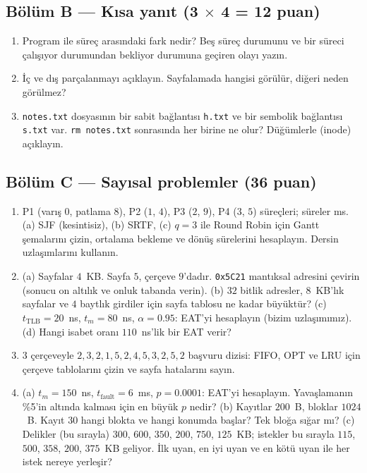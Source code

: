 \documentclass[11pt,a4paper]{article}
\newcommand{\cmd}[1]{\texttt{#1}}
\begin{document}
\subsection*{Bölüm B --- Kısa yanıt (3 $\times$ 4 = 12 puan)}
\begin{enumerate}[leftmargin=1.6em,label=B\arabic*.]
  \item Program ile süreç arasındaki fark nedir? Beş süreç durumunu ve bir süreci çalışıyor durumundan bekliyor durumuna geçiren olayı yazın. 
  \item İç ve dış parçalanmayı açıklayın. Sayfalamada hangisi görülür, diğeri neden görülmez? 
  \item \texttt{notes.txt} dosyasının bir sabit bağlantısı \texttt{h.txt} ve bir sembolik bağlantısı \texttt{s.txt} var. \cmd{rm notes.txt} sonrasında her birine ne olur? Düğümlerle (inode) açıklayın. 
\end{enumerate}

\subsection*{Bölüm C --- Sayısal problemler (36 puan)}
\begin{enumerate}[leftmargin=1.6em,label=C\arabic*.]
  \item P1 (varış $0$, patlama $8$), P2 ($1$, $4$), P3 ($2$, $9$), P4 ($3$, $5$) süreçleri; süreler ms. (a) SJF (kesintisiz), (b) SRTF, (c) $q = 3$ ile Round Robin için Gantt şemalarını çizin, ortalama bekleme ve dönüş sürelerini hesaplayın. Dersin uzlaşımlarını kullanın. 
  \item (a) Sayfalar $4$~KB. Sayfa $5$, çerçeve $9$'dadır. \texttt{0x5C21} mantıksal adresini çevirin (sonucu on altılık ve onluk tabanda verin). (b) $32$ bitlik adresler, $8$~KB'lık sayfalar ve $4$ baytlık girdiler için sayfa tablosu ne kadar büyüktür? (c) $t_{\text{TLB}} = 20$~ns, $t_m = 80$~ns, $\alpha = 0.95$: EAT'yi hesaplayın (bizim uzlaşımımız). (d) Hangi isabet oranı $110$~ns'lik bir EAT verir? 
  \item $3$ çerçeveyle $2, 3, 2, 1, 5, 2, 4, 5, 3, 2, 5, 2$ başvuru dizisi: FIFO, OPT ve LRU için çerçeve tablolarını çizin ve sayfa hatalarını sayın. 
  \item (a) $t_m = 150$~ns, $t_{\text{fault}} = 6$~ms, $p = 0.0001$: EAT'yi hesaplayın. Yavaşlamanın \%5'in altında kalması için en büyük $p$ nedir? (b) Kayıtlar $200$~B, bloklar $1024$~B. Kayıt $30$ hangi blokta ve hangi konumda başlar? Tek bloğa sığar mı? (c) Delikler (bu sırayla) $300$, $600$, $350$, $200$, $750$, $125$~KB; istekler bu sırayla $115$, $500$, $358$, $200$, $375$~KB geliyor. İlk uyan, en iyi uyan ve en kötü uyan ile her istek nereye yerleşir? 
\end{enumerate}
\end{document}
